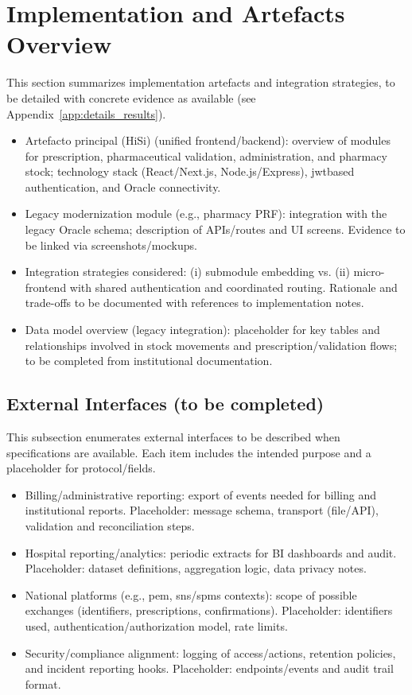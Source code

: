 \section{Implementation and Artefacts Overview}
This section summarizes implementation artefacts and integration strategies, to be detailed with concrete evidence as available (see Appendix~\ref{app:details_results}).
\begin{itemize}
    \item Artefacto principal (HiSi) (unified frontend/backend): overview of modules for prescription, pharmaceutical validation, administration, and pharmacy stock; technology stack (React/Next.js, Node.js/\-Express), \gls{jwt}\-based authentication, and Oracle connectivity.
    \item Legacy modernization module (e.g., pharmacy PRF): integration with the legacy Oracle schema; description of APIs/routes and UI screens. Evidence to be linked via screenshots/mockups.
    \item Integration strategies considered: (i) submodule embedding vs. (ii) micro-frontend with shared authentication and coordinated routing. Rationale and trade-offs to be documented with references to implementation notes.
    \item Data model overview (legacy integration): placeholder for key tables and relationships involved in stock movements and prescription/validation flows; to be completed from institutional documentation.
\end{itemize}

\subsection*{External Interfaces (to be completed)}
This subsection enumerates external interfaces to be described when specifications are available. Each item includes the intended purpose and a placeholder for protocol/fields.
\begin{itemize}
    \item Billing/administrative reporting: export of events needed for billing and institutional reports. Placeholder: message schema, transport (file/API), validation and reconciliation steps.
    \item Hospital reporting/analytics: periodic extracts for BI dashboards and audit. Placeholder: dataset definitions, aggregation logic, data privacy notes.
    \item National platforms (e.g., \gls{pem}, \gls{sns}/\gls{spms} contexts): scope of possible exchanges (identifiers, prescriptions, confirmations). Placeholder: identifiers used, authentication/authorization model, rate limits.
    \item Security/compliance alignment: logging of access/actions, retention policies, and incident reporting hooks. Placeholder: endpoints/events and audit trail format.
\end{itemize}


